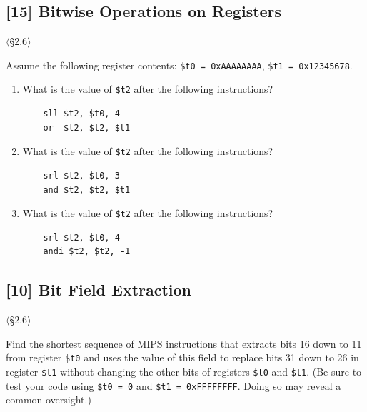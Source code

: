 \problembreak

\subsection{[15] Bitwise Operations on Registers}
\hypertarget{prob-2.17}{}
\noindent$\langle$\S2.6$\rangle$\medskip

\noindent Assume the following register contents:
\texttt{\$t0 = 0xAAAAAAAA}, \texttt{\$t1 = 0x12345678}.

\begin{enumerate}
  \item[2.17.1] [5] What is the value of \texttt{\$t2} after the following
        instructions?
\begin{verbatim}
    sll $t2, $t0, 4
    or  $t2, $t2, $t1
\end{verbatim}
  \item[2.17.2] [5] What is the value of \texttt{\$t2} after the following
        instructions?
\begin{verbatim}
    srl $t2, $t0, 3
    and $t2, $t2, $t1
\end{verbatim}
  \item[2.17.3] [5] What is the value of \texttt{\$t2} after the following
        instructions?
\begin{verbatim}
    srl $t2, $t0, 4
    andi $t2, $t2, -1
\end{verbatim}
\end{enumerate}

\problembreak

\subsection{[10] Bit Field Extraction}
\hypertarget{prob-2.18}{}
\noindent$\langle$\S2.6$\rangle$\medskip

\noindent Find the shortest sequence of MIPS instructions that extracts bits
16 down to 11 from register \texttt{\$t0} and uses the value of this field to
replace bits 31 down to 26 in register \texttt{\$t1} without changing the
other bits of registers \texttt{\$t0} and \texttt{\$t1}. (Be sure to test
your code using \texttt{\$t0 = 0} and \texttt{\$t1 = 0xFFFFFFFF}. Doing so
may reveal a common oversight.)

